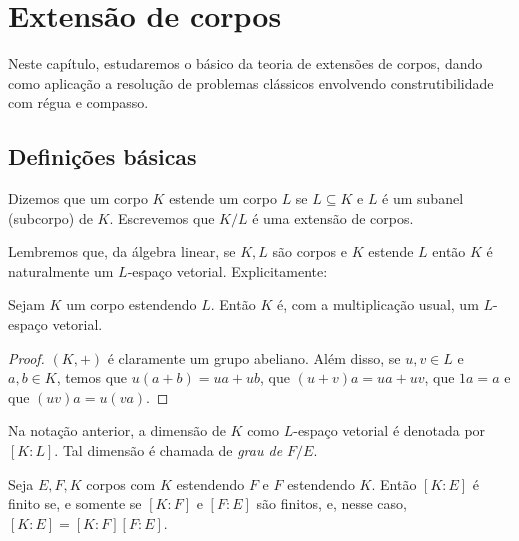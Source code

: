 \chapter{Extensão de corpos}
Neste capítulo, estudaremos o básico da teoria de extensões de corpos, dando como aplicação a resolução de problemas clássicos envolvendo construtibilidade com régua e compasso.
\section{Definições básicas}
\begin{definition}
Dizemos que um corpo $K$ estende um corpo $L$ se $L\subseteq K$ e $L$ é um subanel (subcorpo) de $K$. Escrevemos que $K/L$ é uma extensão de corpos.
\end{definition}

Lembremos que, da álgebra linear, se $K, L$ são corpos e $K$ estende $L$ então $K$ é naturalmente um $L$-espaço vetorial. Explicitamente:

\begin{prop}
    Sejam $K$ um corpo estendendo $L$. Então $K$ é, com a multiplicação usual, um $L$-espaço vetorial.
\end{prop}

\begin{proof}
    $(K, +)$ é claramente um grupo abeliano. Além disso, se $u, v \in L$ e $a, b \in K$, temos que $u(a+b)=ua+ub$, que $(u+v)a=ua+uv$, que $1a=a$ e que $(uv)a=u(va)$.
\end{proof}

\begin{definition}
Na notação anterior, a dimensão de $K$ como $L$-espaço vetorial é denotada por $[K:L]$. Tal dimensão é chamada de \emph{grau de $F/E$}.
\end{definition}

\begin{lemma}
Seja $E, F, K$ corpos com $K$ estendendo $F$ e $F$ estendendo $K$. Então $[K:E]$ é finito se, e somente se $[K:F]$ e $[F:E]$ são finitos, e, nesse caso, $[K:E]=[K:F][F:E]$.
\end{lemma}

